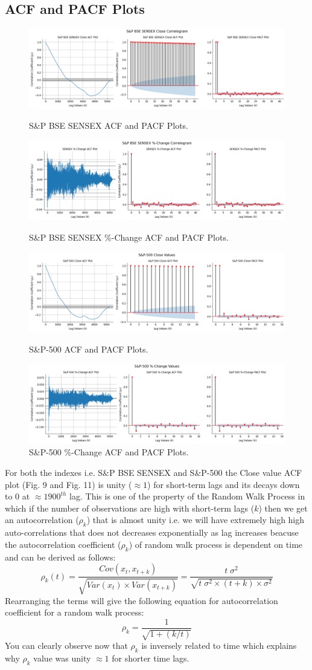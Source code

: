 \documentclass[conference]{IEEEtran}
\begin{document}
\subsection{ACF and PACF Plots}
\begin{figure}[htbp]
	\centering
	\includegraphics[width = 0.50 \textwidth]{images/SENSEX ACF and PACF Plot.png}
	\caption{S\&P BSE SENSEX ACF and PACF Plots.}
	\includegraphics[width = 0.50 \textwidth]{images/SENSEX Change ACF, PACF Plots.png}
	\caption{S\&P BSE SENSEX \%-Change ACF and PACF Plots.}
	\includegraphics[width = 0.50 \textwidth]{images/S&P-500 ACF, PACF Plots.png}
	\caption{S\&P-500 ACF and PACF Plots.}
	\includegraphics[width = 0.50 \textwidth]{images/S and P-500 Change ACF PACF Plot.png}
	\caption{S\&P-500 \%-Change ACF and PACF Plots.}
\end{figure}
For both the indexes i.e. S\&P BSE SENSEX and S\&P-500 the Close value ACF plot (Fig. 9 and Fig. 11) is unity ($\approx 1$) for short-term lags and its decays down to $0$ at $\approx 1900^{th}$ lag. This is one of the property of the Random Walk Process in which if the number of observations are high with short-term lags ($k$) then we get an autocorrelation ($\rho_{k}$) that is almost unity i.e. we will have extremely high high auto-correlations that does not decreases exponentially as lag increases beacuse the autocorrelation coefficient ($\rho_{k}$) of random walk process is dependent on time and can be derived as follows:
$$\rho_{k}(t) = \frac{Cov(x_{t}, x_{t+k})}{\sqrt{Var(x_{t}) \times Var(x_{t + k})}} = \frac{t\;\sigma^{2}}{\sqrt{t\;\sigma^{2}\times(t + k)\times \sigma^{2}}}$$
Rearranging the terms will give the following equation for autocorrelation coefficient for a random walk process:
$$\rho_{k} = \frac{1}{\sqrt{1 + (k / t)}}$$
You can clearly observe now that $\rho_{k}$ is inversely related to time which explains why $\rho_{k}$ value was unity $\approx 1$ for shorter time lags. 
\end{document}
